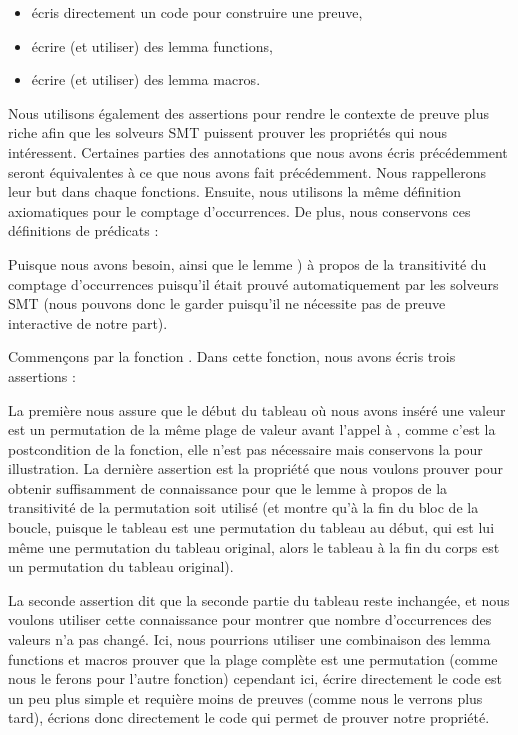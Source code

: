 \begin{itemize}
    \item écris directement un code pour construire une preuve,
    \item écrire (et utiliser) des lemma functions,
    \item écrire (et utiliser) des lemma macros.
\end{itemize}


Nous utilisons également des assertions pour rendre le contexte de preuve plus
riche afin que les solveurs SMT puissent prouver les propriétés qui nous intéressent.
Certaines parties des annotations que nous avons écris précédemment seront
équivalentes à ce que nous avons fait précédemment. Nous rappellerons leur
but dans chaque fonctions. Ensuite, nous utilisons la même définition axiomatiques
pour le comptage d'occurrences. De plus, nous conservons ces définitions de
prédicats :




Puisque nous avons besoin, ainsi que le lemme ) à propos de la transitivité du
comptage d'occurrences puisqu'il était prouvé automatiquement par les solveurs
SMT (nous pouvons donc le garder puisqu'il ne nécessite pas de preuve interactive
de notre part).




Commençons par la fonction . Dans cette fonction,
nous avons écris trois assertions :




La première nous assure que le début du tableau où nous avons inséré une valeur
est un permutation de la même plage de valeur avant l'appel à ,
comme c'est la postcondition de la fonction, elle n'est pas nécessaire mais
conservons la pour illustration. La dernière assertion est la propriété que
nous voulons prouver pour obtenir suffisamment de connaissance pour que le
lemme à propos de la transitivité de la permutation soit utilisé (et montre qu'à
la fin du bloc de la boucle, puisque le tableau est une permutation du tableau
au début, qui est lui même une permutation du tableau original, alors le tableau
à la fin du corps est un permutation du tableau original).


La seconde assertion dit que la seconde partie du tableau reste inchangée, et nous
voulons utiliser cette connaissance pour montrer que nombre d'occurrences des
valeurs n'a pas changé. Ici, nous pourrions utiliser une combinaison des lemma
functions et macros prouver que la plage complète est une permutation (comme nous
le ferons pour l'autre fonction) cependant ici, écrire directement le code est
un peu plus simple et requière moins de preuves (comme nous le verrons plus tard),
écrions donc directement le code qui permet de prouver notre propriété.


